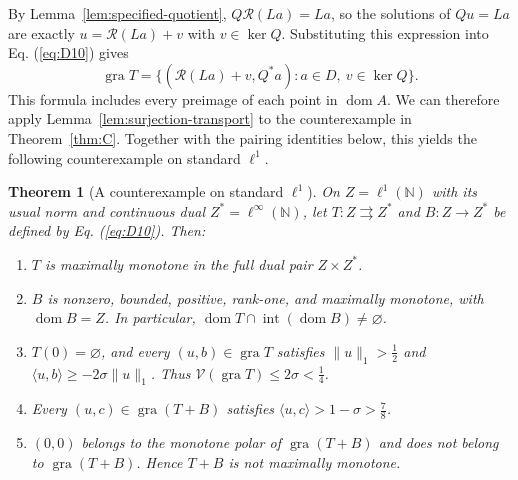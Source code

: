 \documentclass[11pt]{article}
\newcommand{\N}{\mathbb N}
\newcommand{\gra}{\operatorname{gra}}
\newcommand{\dom}{\operatorname{dom}}
\newcommand{\pair}[2]{\langle #1,#2\rangle}
\newtheorem{theorem}{Theorem}
\theoremstyle{definition}
\theoremstyle{remark}
\begin{document}
By Lemma~\ref{lem:specified-quotient}, $Q\mathcal R(La)=La$, so the solutions of $Qu=La$ are exactly $u=\mathcal R(La)+v$ with $v\in\ker Q$. Substituting this expression into Eq. (\ref{eq:D10}) gives
\begin{equation}
\gra T=\{(\mathcal R(La)+v,Q^*a):a\in D,\ v\in\ker Q\}.
\label{eq:L4}
\end{equation}
This formula includes every preimage of each point in $\dom A$. We can therefore apply Lemma~\ref{lem:surjection-transport} to the counterexample in Theorem~\ref{thm:C}. Together with the pairing identities below, this yields the following counterexample on standard $\ell^1$.


\begin{theorem}[A counterexample on standard $\ell^1$]\label{thm:L}
On $Z=\ell^1(\N)$ with its usual norm and continuous dual $Z^*=\ell^\infty(\N)$, let $T:Z\rightrightarrows Z^*$ and $B:Z\to Z^*$ be defined by Eq. (\ref{eq:D10}). Then:
\begin{enumerate}
\item\label{thm:L-maximality} $T$ is maximally monotone in the full dual pair $Z\times Z^*$.
\item\label{thm:L-partner} $B$ is nonzero, bounded, positive, rank-one, and maximally monotone,
with $\dom B=Z$. In particular, $\dom T\cap\operatorname{int}(\dom B)\ne\varnothing$.
\item\label{thm:L-bound} $T(0)=\varnothing$, and every $(u,b)\in\gra T$ satisfies
$\|u\|_1>\frac{1}{2}$ and $\pair{u}{b}\ge-2\sigma\|u\|_1$. Thus $\mathcal V(\gra T)\le2\sigma<\frac{1}{4}$.
\item\label{thm:L-pairing} Every $(u,c)\in\gra(T+B)$ satisfies
$\pair{u}{c}>1-\sigma>\frac{7}{8}$.
\item\label{thm:L-sum} $(0,0)$ belongs to the monotone polar of $\gra(T+B)$ and does
not belong to $\gra(T+B)$. Hence $T+B$ is not maximally monotone.
\end{enumerate}
\end{theorem}
\end{document}
